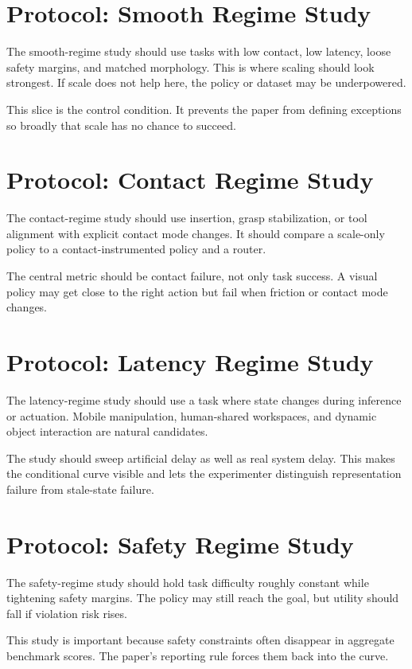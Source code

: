 \section{Protocol: Smooth Regime Study}

The smooth-regime study should use tasks with low contact, low latency, loose safety margins, and matched morphology. This is where scaling should look strongest. If scale does not help here, the policy or dataset may be underpowered.

This slice is the control condition. It prevents the paper from defining exceptions so broadly that scale has no chance to succeed.

\section{Protocol: Contact Regime Study}

The contact-regime study should use insertion, grasp stabilization, or tool alignment with explicit contact mode changes. It should compare a scale-only policy to a contact-instrumented policy and a router.

The central metric should be contact failure, not only task success. A visual policy may get close to the right action but fail when friction or contact mode changes.

\section{Protocol: Latency Regime Study}

The latency-regime study should use a task where state changes during inference or actuation. Mobile manipulation, human-shared workspaces, and dynamic object interaction are natural candidates.

The study should sweep artificial delay as well as real system delay. This makes the conditional curve visible and lets the experimenter distinguish representation failure from stale-state failure.

\section{Protocol: Safety Regime Study}

The safety-regime study should hold task difficulty roughly constant while tightening safety margins. The policy may still reach the goal, but utility should fall if violation risk rises.

This study is important because safety constraints often disappear in aggregate benchmark scores. The paper's reporting rule forces them back into the curve.

